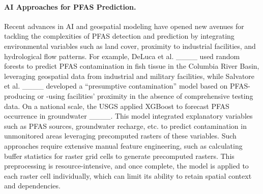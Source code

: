 \paragraph{AI Approaches for PFAS Prediction.}
Recent advances in AI and geospatial modeling have opened new avenues for tackling the complexities of PFAS detection and prediction by integrating environmental variables such as land cover, proximity to industrial facilities, and hydrological flow patterns. For example, DeLuca et al. ____ used random forests to predict PFAS contamination in fish tissue in the Columbia River Basin, leveraging geospatial data from industrial and military facilities, while Salvatore et al. ____ developed a \enquote{presumptive contamination} model based on PFAS-producing or -using facilities' proximity in the absence of comprehensive testing data. On a national scale, the USGS applied XGBoost to forecast PFAS occurrence in groundwater ____. This model integrated explanatory variables such as PFAS sources, groundwater recharge, etc. to predict contamination in unmonitored areas leveraging precomputed rasters of these variables. Such approaches require extensive manual feature engineering, such as calculating buffer statistics for raster grid cells to generate precomputed rasters. This preprocessing is resource-intensive, and once complete, the model is applied to each raster cell individually, which can limit its ability to retain spatial context and dependencies.

